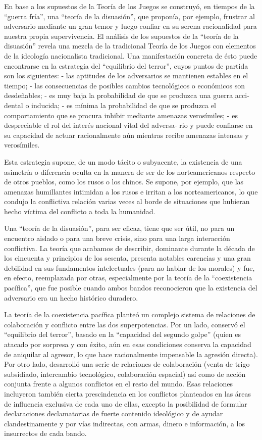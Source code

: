 \documentclass[
]{book}
\begin{document}
En base a los supuestos de la Teoría de los Juegos se construyó, en tiempos de la ``guerra fría'', una ``teoría de la disuasión'', que proponía, por ejemplo, frustrar al adversario mediante un gran temor y luego confiar en su serena racionalidad para nuestra propia supervivencia. El análisis de los supuestos de la ``teoría de la disuasión'' revela una mezcla de la tradicional Teoría de los Juegos con elementos de la ideología nacionalista tradicional. Una manifestación concreta de ésto puede encontrarse en la estrategia del ``equilibrio del terror'', cuyos puntos de partida son los siguientes: - las aptitudes de los adversarios se mantienen estables en el tiempo; - las consecuencias de posibles cambios tecnológicos o económicos son desdeñables; - es muy baja la probabilidad de que se produzca una guerra acci- dental o inducida; - es mínima la probabilidad de que se produzca el comportamiento que se procura inhibir mediante amenazas verosímiles; - es despreciable el rol del interés nacional vital del adversa- rio y puede confiarse en su capacidad de actuar racionalmente aún mientras recibe amenazas intensas y verosímiles.

Esta estrategia supone, de un modo tácito o subyacente, la existencia de una asimetría o diferencia oculta en la manera de ser de los norteamericanos respecto de otros pueblos, como los rusos o los chinos. Se supone, por ejemplo, que las amenazas humillantes intimidan a los rusos e irritan a los norteamericanos, lo que condujo la conflictiva relación varias veces al borde de situaciones que hubieran hecho víctima del conflicto a toda la humanidad.

Una ``teoría de la disuasión'', para ser eficaz, tiene que ser útil, no para un encuentro aislado o para una breve crisis, sino para una larga interacción conflictiva. La teoría que acabamos de describir, dominante durante la década de los cincuenta y principios de los sesenta, presenta notables carencias y una gran debilidad en sus fundamentos intelectuales (para no hablar de los morales) y fue, en efecto, reemplazada por otras, especialmente por la teoría de la ``coexistencia pacífica'', que fue posible cuando ambos bandos reconocieron que la existencia del adversario era un hecho histórico duradero.

La teoría de la coexistencia pacífica planteó un complejo sistema de relaciones de colaboración y conflicto entre las dos superpotencias. Por un lado, conservó el ``equilibrio del terror'', basado en la ``capacidad del segundo golpe'' (quien es atacado por sorpresa y con éxito, aún en esas condiciones conserva la capacidad de aniquilar al agresor, lo que hace racionalmente impensable la agresión directa). Por otro lado, desarrolló una serie de relaciones de colaboración (venta de trigo subsidiado, intercambio tecnológico, colaboración espacial) así como de acción conjunta frente a algunos conflictos en el resto del mundo. Esas relaciones incluyeron también cierta prescindencia en los conflictos planteados en las áreas de influencia exclusiva de cada uno de ellas, excepto la posibilidad de formular declaraciones declamatorias de fuerte contenido ideológico y de ayudar clandestinamente y por vías indirectas, con armas, dinero e información, a los insurrectos de cada bando.
\end{document}
